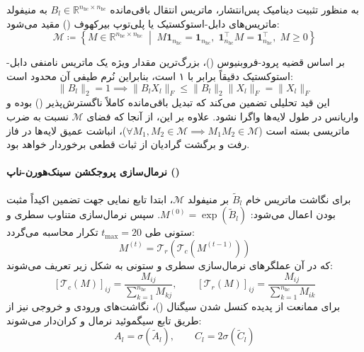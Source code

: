 به منظور تثبیت دینامیک پس‌انتشار، ماتریس انتقال باقی‌مانده $B_l \in \mathbb{R}^{n_{\text{hc}} \times n_{\text{hc}}}$ به منیفولد ماتریس‌های دابل-استوکستیک یا پلی‌توپ بیرکهوف () مقید می‌شود:
\begin{equation}
    \mathcal{M} \coloneqq \left\{ M \in \mathbb{R}^{n_{\text{hc}} \times n_{\text{hc}}} \;\middle|\; M \mathbf{1}_{n_{\text{hc}}} = \mathbf{1}_{n_{\text{hc}}}, \; \mathbf{1}_{n_{\text{hc}}}^\top M = \mathbf{1}_{n_{\text{hc}}}^\top, \; M \ge 0 \right\}
\end{equation}

بر اساس قضیه پرود-فروبنیوس ()، بزرگ‌ترین مقدار ویژه یک ماتریس نامنفی دابل-استوکستیک دقیقاً برابر با ۱ است، بنابراین نُرم طیفی آن محدود است:
\begin{equation}
    \|B_l\|_2 = 1 \implies \|B_l X_l\|_F \le \|B_l\|_2 \|X_l\|_F = \|X_l\|_F
\end{equation}
این قید تحلیلی تضمین می‌کند که تبدیل باقی‌مانده کاملاً ناگسترش‌پذیر () بوده و واریانس در طول لایه‌ها واگرا نشود. علاوه بر این، از آنجا که فضای $\mathcal{M}$ نسبت به ضرب ماتریسی بسته است ($\forall M_1, M_2 \in \mathcal{M} \implies M_1 M_2 \in \mathcal{M}$)، انباشت عمیق لایه‌ها در فاز رفت و برگشت گرادیان از ثبات قطعی برخوردار خواهد بود.

\paragraph*{نرمال‌سازی پروجکشن سینک‌هورن-ناپ ()}
برای نگاشت ماتریس خام $\tilde{B}_l$ بر منیفولد $\mathcal{M}$، ابتدا تابع نمایی جهت تضمین اکیداً مثبت بودن اعمال می‌شود: $M^{(0)} = \exp(\tilde{B}_l)$. سپس نرمال‌سازی متناوب سطری و ستونی طی $t_{\max} = 20$ تکرار محاسبه می‌گردد:
\begin{equation}
    M^{(t)} = \mathcal{T}_r(\mathcal{T}_c(M^{(t-1)}))
\end{equation}
که در آن عملگرهای نرمال‌سازی سطری و ستونی به شکل زیر تعریف می‌شوند:
\begin{equation}
    \left[\mathcal{T}_c(M)\right]_{ij} = \frac{M_{ij}}{\sum_{k=1}^{n_{\text{hc}}} M_{kj}}, \qquad \left[\mathcal{T}_r(M)\right]_{ij} = \frac{M_{ij}}{\sum_{k=1}^{n_{\text{hc}}} M_{ik}}
\end{equation}
برای ممانعت از پدیده کنسل شدن سیگنال ()، نگاشت‌های ورودی و خروجی نیز از طریق تابع سیگموئید نرمال و کران‌دار می‌شوند:
\begin{equation}
    A_l = \sigma(\tilde{A}_l), \qquad C_l = 2\sigma(\tilde{C}_l)
\end{equation}

